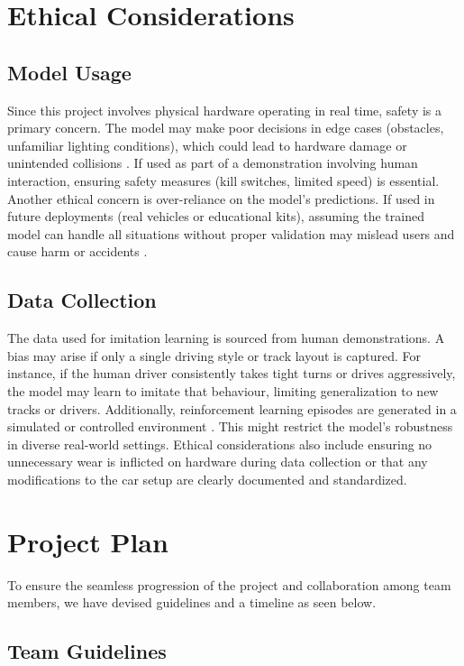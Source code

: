 \documentclass{article} %
\begin{document}
\section{Ethical Considerations}

\subsection{Model Usage}
Since this project involves physical hardware operating in real time, safety is a primary concern. The model may make poor decisions in edge cases 
(obstacles, unfamiliar lighting conditions), which could lead to hardware damage or unintended collisions \citep{dalrymple2024guaranteedsafeaiframework}. If used as part of a demonstration 
involving human interaction, ensuring safety measures (kill switches, limited speed) is essential. Another ethical concern is over-reliance on the 
model's predictions. If used in future deployments (real vehicles or educational kits), assuming the trained model can handle all situations without 
proper validation may mislead users and cause harm or accidents \citep{laskey2017comparinghumancentricrobotcentricsampling}. 


\subsection{Data Collection}
The data used for imitation learning is sourced from human demonstrations. A bias may arise if only a single driving style or track layout is captured.
For instance, if the human driver consistently takes tight turns or drives aggressively, the model may learn to imitate that behaviour, limiting 
generalization to new tracks or drivers. Additionally, reinforcement learning episodes are generated in a simulated or controlled environment 
\citep{laskey2017comparinghumancentricrobotcentricsampling}. 
This might restrict the model's robustness in diverse real-world settings. Ethical considerations also include ensuring no unnecessary wear is inflicted 
on hardware during data collection or that any modifications to the car setup are clearly documented and standardized.

\section{Project Plan}
To ensure the seamless progression of the project and collaboration among team members, we have devised guidelines and a timeline as seen below.

\subsection{Team Guidelines}
\end{document}
